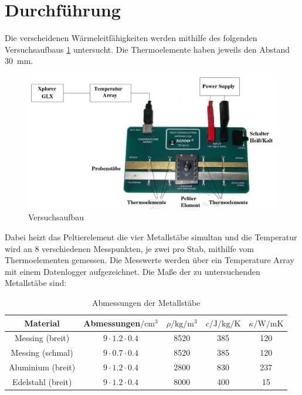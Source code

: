 \section{Durchführung}
\label{sec:Durchführung}
Die verscheidenen Wärmeleitfähigkeiten werden mithilfe des folgenden Versuchsaufbaus \ref{fig:aufbau}
untersucht. Die Thermoelemente haben jeweils den Abstand \SI{30}{\milli\meter}.
\begin{figure}
    \centering
    \includegraphics[width=\textwidth]{content/aufbau.png}
    \caption{Versuchsaufbau\cite{v204}}
    \label{fig:aufbau}
\end{figure}
Dabei heizt das Peltierelement die vier Metallstäbe simultan und die Temperatur wird an 8
verschiedenen Messpunkten, je zwei pro Stab, mithilfe vom Thermoelementen gemessen. Die
Messwerte werden über ein Temperature Array mit einem Datenlogger aufgezeichnet.
Die Maße der zu untersuchenden Metallstäbe sind:
\begin{table}
    \centering
    \caption{Abmessungen der Metallstäbe \cite{v204}}
    \label{tab:werte}
    \begin{tabular}{c c S[table-format=4.0] S S}
       \toprule
        {Material} & {Abmessungen$/\si{\centi\meter\cubed}$} &{$\rho/\si{\kg\per\meter\cubed}$} &{$c/\si{\joule\per\kg\per\kelvin}$} &{$\kappa/\si{\watt\per\meter\kelvin}$\cite{waermeleit}} \\
        \midrule
        Messing (breit) & $9 \cdot 1.2 \cdot 0.4$ & 8520 & 385 & 120 \\
        Messing (schmal) & $9 \cdot 0.7 \cdot 0.4$ & 8520 & 385 & 120 \\
        Aluminium (breit) & $9 \cdot 1.2 \cdot 0.4$ & 2800 & 830 & 237 \\
        Edelstahl (breit) & $9 \cdot 1.2 \cdot 0.4$ & 8000 & 400 & 15 \\
        \bottomrule
    \end{tabular}
\end{table}
%
